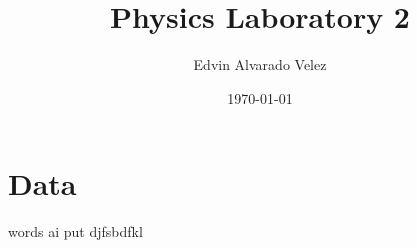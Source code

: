\documentclass[a4paper,12pt]{article}
\title{Physics Laboratory 2}
\author{Edvin Alvarado Velez}
\date{\today}
\begin{document}
\maketitle
\tableofcontents

\section{Data}
words ai put djfsbdfkl
\end{document}
